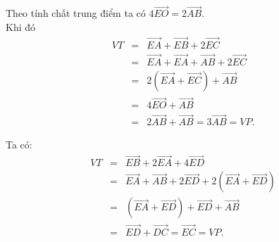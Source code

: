 \begin{bt}
{\begin{listEX}
			\item Theo tính chất trung điểm ta có $4\overrightarrow{EO} = 2\overrightarrow{AB}$.\\
			Khi đó
			{\allowdisplaybreaks
				\begin{eqnarray*}
					VT&=&\overrightarrow{EA} + \overrightarrow{EB} + 2\overrightarrow{EC} \\
					&=& \overrightarrow{EA} + \overrightarrow{EA} + \overrightarrow{AB} + 2\overrightarrow{EC}\\
					&=& 2\left(\overrightarrow{EA} + \overrightarrow{EC}\right) + \overrightarrow{AB} \\
					&=& 4\overrightarrow{EO} + \overrightarrow{AB} \\
					&=& 2\overrightarrow{AB} + \overrightarrow{AB} = 3\overrightarrow{AB} = VP.
			\end{eqnarray*}}
			\item Ta có:
			{\allowdisplaybreaks
				\begin{eqnarray*}
					VT&=&\overrightarrow{EB} + 2\overrightarrow{EA} + 4\overrightarrow{ED} \\
					&=& \overrightarrow{EA} + \overrightarrow{AB} + 2\overrightarrow{ED} + 2\left(\overrightarrow{EA} + \overrightarrow{ED}\right)\\
					&=& \left(\overrightarrow{EA} + \overrightarrow{ED}\right) + \overrightarrow{ED} + \overrightarrow{AB} \\
					&=& \overrightarrow{ED} + \overrightarrow{DC} = \overrightarrow{EC} = VP.
			\end{eqnarray*}}
		\end{listEX}
	}
\end{bt}

